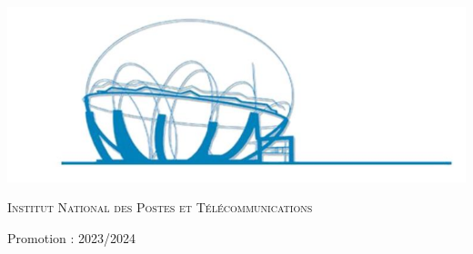 \begin{center}
\begin{tabular}{p{1cm}lll}
\end{tabular}

\vspace{0.5cm}
\includegraphics[scale=0.6]{Logos/ZLAFA.png}


\textsc{Institut National des Postes et Télécommunications}

{\large Promotion : 2023/2024}
   
\end{center}


